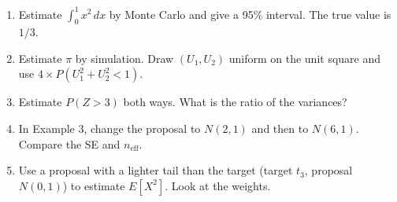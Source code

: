 \documentclass[
]{article}
\providecommand{\tightlist}{%
  \setlength{\itemsep}{0pt}\setlength{\parskip}{0pt}}
\begin{document}
\begin{enumerate}
\def\labelenumi{\arabic{enumi}.}
\tightlist
\item
  Estimate \(\int_0^1 x^2\,dx\) by Monte Carlo and give a 95\% interval.
  The true value is \(1/3\).
\item
  Estimate \(\pi\) by simulation. Draw \((U_1,U_2)\) uniform on the unit
  square and use \(4 \times P(U_1^2+U_2^2<1)\).
\item
  Estimate \(P(Z>3)\) both ways. What is the ratio of the variances?
\item
  In Example 3, change the proposal to \(N(2,1)\) and then to
  \(N(6,1)\). Compare the SE and \(n_{\text{eff}}\).
\item
  Use a proposal with a lighter tail than the target (target \(t_3\),
  proposal \(N(0,1)\)) to estimate \(E[X^2]\). Look at the weights.
\end{enumerate}
\end{document}
